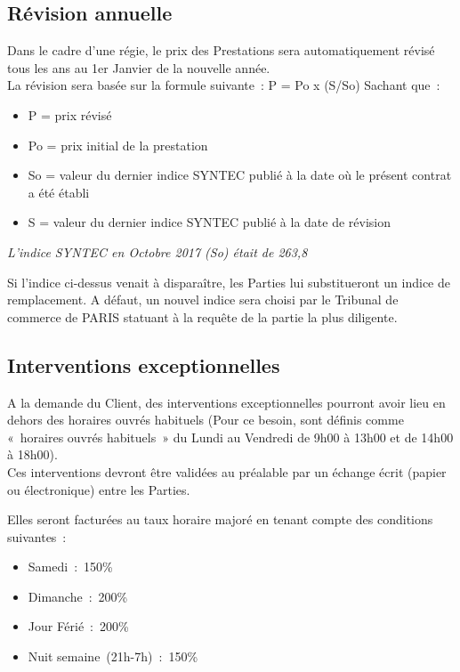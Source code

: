 \documentclass[8pt,french]{base}
\begin{document}
\begin{multicols*}{3}
\subsection{Révision annuelle}

Dans le cadre d'une régie, le prix des Prestations sera automatiquement révisé tous les ans au 1er Janvier de la nouvelle année. \\
La révision sera basée sur la formule suivante~: P = Po x (S/So)
Sachant que~:
\begin{itemize}
  \item P = prix révisé
  \item Po = prix initial de la prestation
  \item So = valeur du dernier indice SYNTEC publié à la date où le présent contrat a été établi
  \item S = valeur du dernier indice SYNTEC publié à la date de révision
\end{itemize}
{\itshape L’indice SYNTEC en Octobre 2017 (So) était de 263,8} \par

Si l'indice ci-dessus venait à disparaître, les Parties lui substitueront
un indice de remplacement. A défaut, un nouvel indice sera choisi par le Tribunal de commerce de PARIS statuant à la requête de la partie la plus diligente.

\subsection{Interventions exceptionnelles}

A la demande du Client, des interventions exceptionnelles pourront
avoir lieu en dehors des horaires ouvrés habituels (Pour ce besoin, sont définis comme «~horaires ouvrés habituels~» du Lundi au Vendredi de
9h00 à 13h00 et de 14h00 à 18h00). \\
Ces interventions devront être validées au préalable par un échange écrit (papier ou électronique) entre les Parties. \par
Elles seront facturées au taux horaire majoré en tenant compte des conditions suivantes~:
\begin{itemize}
  \item Samedi~:~150\%
  \item Dimanche~:~200\%
  \item Jour Férié~:~200\%
  \item Nuit semaine~(21h-7h)~:~150\%
\end{itemize}


\end{multicols*}
\end{document}
